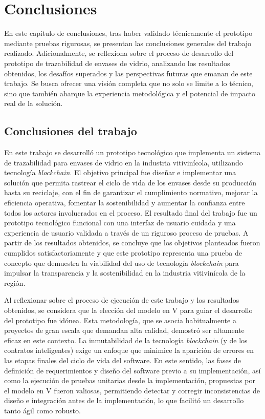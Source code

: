 \chapter[Conclusiones]{Conclusiones}
\label{cp:conclusions}

\parindent0pt

En este capítulo de conclusiones, tras haber validado técnicamente el prototipo mediante pruebas rigurosas, se presentan las conclusiones generales del trabajo realizado. Adicionalmente, se reflexiona sobre el proceso de desarrollo del prototipo de trazabilidad de envases de vidrio, analizando los resultados obtenidos, los desafíos superados y las perspectivas futuras que emanan de este trabajo. Se busca ofrecer una visión completa que no solo se limite a lo técnico, sino que también abarque la experiencia metodológica y el potencial de impacto real de la solución.

\section{Conclusiones del trabajo}


En este trabajo se desarrolló un prototipo tecnológico que implementa un sistema de trazabilidad para envases de vidrio en la industria vitivinícola, utilizando tecnología \textit{blockchain}. El objetivo principal fue diseñar e implementar una solución que permita rastrear el ciclo de vida de los envases desde su producción hasta su reciclaje, con el fin de garantizar el cumplimiento normativo, mejorar la eficiencia operativa, fomentar la sostenibilidad y aumentar la confianza entre todos los actores involucrados en el proceso. El resultado final del trabajo fue un prototipo tecnológico funcional con una interfaz de usuario cuidada y una experiencia de usuario validada a través de un riguroso proceso de pruebas. A partir de los resultados obtenidos, se concluye que los objetivos planteados fueron cumplidos satisfactoriamente y que este prototipo representa una prueba de concepto que demuestra la viabilidad del uso de tecnología \textit{blockchain} para impulsar la transparencia y la sostenibilidad en la industria vitivinícola de la región.

Al reflexionar sobre el proceso de ejecución de este trabajo y los resultados obtenidos, se considera que la elección del modelo en V para guiar el desarrollo del prototipo fue idónea. Esta metodología, que se asocia habitualmente a proyectos de gran escala que demandan alta calidad, demostró ser altamente eficaz en este contexto. La inmutabilidad de la tecnología \textit{blockchain} (y de los contratos inteligentes) exige un enfoque que minimice la aparición de errores en las etapas finales del ciclo de vida del software. En este sentido, las fases de definición de requerimientos y diseño del software previo a su implementación, así como la ejecución de pruebas unitarias desde la implementación, propuestas por el modelo en V fueron valiosas, permitiendo detectar y corregir inconsistencias de diseño e integración antes de la implementación, lo que facilitó un desarrollo tanto ágil como robusto.

